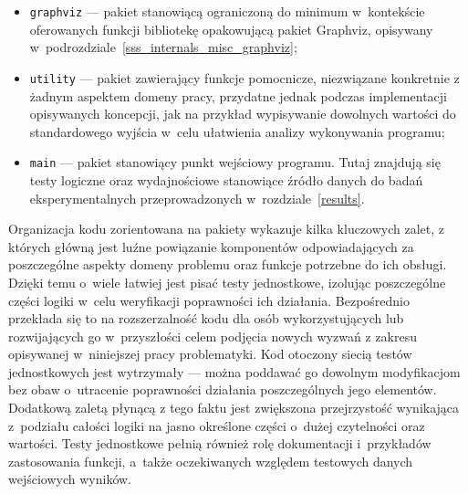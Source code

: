 {\begin{itemize}
    \item \texttt{graphviz} --- pakiet stanowiącą ograniczoną do minimum w~kontekście oferowanych funkcji bibliotekę opakowującą pakiet Graphviz, opisywany w~podrozdziale~\ref{sss_internals_misc_graphviz};
    \item \texttt{utility} --- pakiet zawierający funkcje pomocnicze, niezwiązane konkretnie z żadnym aspektem domeny pracy, przydatne jednak podczas implementacji opisywanych koncepcji, jak na przykład wypisywanie dowolnych wartości do standardowego wyjścia w~celu ułatwienia analizy wykonywania programu;
    \item \texttt{main} --- pakiet stanowiący punkt wejściowy programu. Tutaj znajdują się testy logiczne oraz wydajnościowe stanowiące źródło danych do badań eksperymentalnych przeprowadzonych w~rozdziale~\ref{results}.
  \end{itemize}
}
\par{
  Organizacja kodu zorientowana na pakiety wykazuje kilka kluczowych zalet, z których główną jest luźne powiązanie komponentów odpowiadających za poszczególne aspekty domeny problemu oraz funkcje potrzebne do ich obsługi.
  Dzięki temu o~wiele łatwiej jest pisać testy jednostkowe, izolując poszczególne części logiki w~celu weryfikacji poprawności ich działania. 
  Bezpośrednio przekłada się to na rozszerzalność kodu dla osób wykorzystujących lub rozwijających go w~przyszłości celem podjęcia nowych wyzwań z zakresu opisywanej w~niniejszej pracy problematyki.
  Kod otoczony siecią testów jednostkowych jest wytrzymały --- można poddawać go dowolnym modyfikacjom bez obaw o~utracenie poprawności działania poszczególnych jego elementów.
  Dodatkową zaletą płynącą z tego faktu jest zwiększona przejrzystość wynikająca z~podziału całości logiki na jasno określone części o~dużej czytelności oraz wartości.
  Testy jednostkowe pełnią również rolę dokumentacji i~przykładów zastosowania funkcji, a~także oczekiwanych względem testowych danych wejściowych wyników.
}